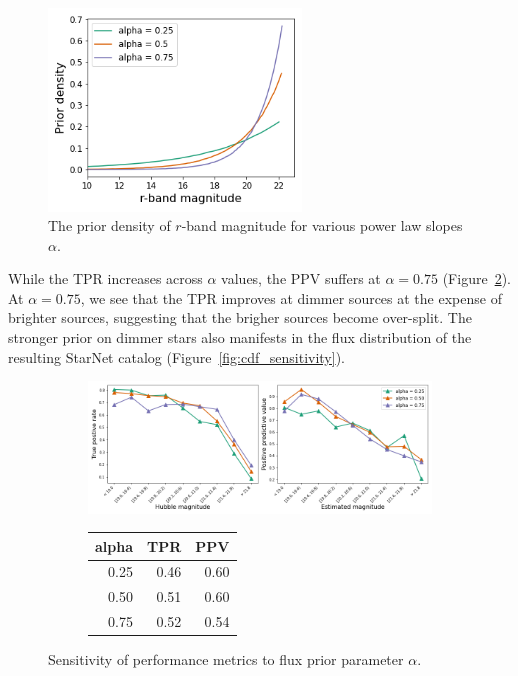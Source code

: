 \begin{figure}[!h]
    \centering
    \includegraphics[width = 0.6\textwidth]{figures/prior_sensitivity/prior_fluxes.png}
    \caption{The prior density of $r$-band magnitude for various power law slopes $\alpha$.}
    \label{fig:flux_priors}
\end{figure}

While the TPR increases across $\alpha$ values, the PPV suffers at $\alpha = 0.75$ (Figure~\ref{fig:alpha_sensitivity}).
At $\alpha = 0.75$, we see that the TPR improves at dimmer sources at the expense of brighter sources, suggesting that the brigher sources become over-split. 
The stronger prior on dimmer stars also manifests in the flux distribution of the resulting StarNet catalog (Figure~\ref{fig:cdf_sensitivity}). 

\begin{figure}[ht]
\begin{subfigure}{\textwidth}
\centering
\includegraphics[width = \textwidth]{figures/prior_sensitivity/prior_alpha_sensitivity.png}
\end{subfigure}
\begin{subfigure}{\textwidth}
\begin{center}
\begin{tabular}{rrr}
\toprule
 alpha &   TPR &   PPV \\
\midrule
  0.25 &  0.46 &  0.60 \\
  0.50 &  0.51 &  0.60 \\
  0.75 &  0.52 &  0.54 \\
\bottomrule
\end{tabular}
\par\vspace{0pt}
\end{center}
\end{subfigure}\hfill
\caption{Sensitivity of performance metrics to flux prior parameter $\alpha$. }
\label{fig:alpha_sensitivity}
\end{figure}

